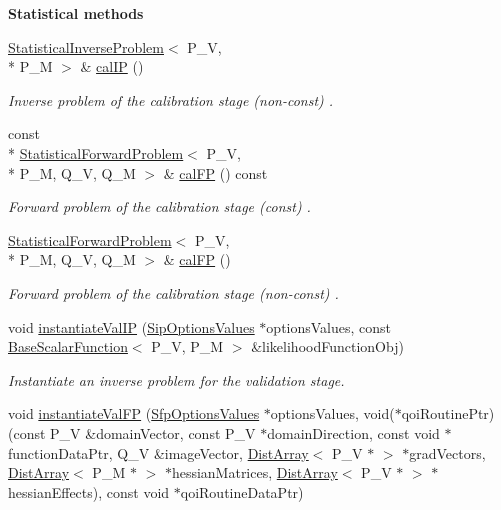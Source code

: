 \begin{Indent}{\bf Statistical methods}
\begin{DoxyCompactItemize}
\hyperlink{class_q_u_e_s_o_1_1_statistical_inverse_problem}{Statistical\-Inverse\-Problem}$<$ P\-\_\-\-V, \\*
P\-\_\-\-M $>$ \& \hyperlink{class_q_u_e_s_o_1_1_validation_cycle_a4ac209596278774d5f12e6d806a87d0a}{cal\-I\-P} ()
\begin{DoxyCompactList}\small\item\em Inverse problem of the calibration stage (non-\/const) . \end{DoxyCompactList}\item 
const \\*
\hyperlink{class_q_u_e_s_o_1_1_statistical_forward_problem}{Statistical\-Forward\-Problem}$<$ P\-\_\-\-V, \\*
P\-\_\-\-M, Q\-\_\-\-V, Q\-\_\-\-M $>$ \& \hyperlink{class_q_u_e_s_o_1_1_validation_cycle_ab3ee54cdc9d1d6f726414f4fd2142c56}{cal\-F\-P} () const 
\begin{DoxyCompactList}\small\item\em Forward problem of the calibration stage (const) . \end{DoxyCompactList}\item 
\hyperlink{class_q_u_e_s_o_1_1_statistical_forward_problem}{Statistical\-Forward\-Problem}$<$ P\-\_\-\-V, \\*
P\-\_\-\-M, Q\-\_\-\-V, Q\-\_\-\-M $>$ \& \hyperlink{class_q_u_e_s_o_1_1_validation_cycle_ad8214c581b3e0879cae7d0643af99f69}{cal\-F\-P} ()
\begin{DoxyCompactList}\small\item\em Forward problem of the calibration stage (non-\/const) . \end{DoxyCompactList}\item 
void \hyperlink{class_q_u_e_s_o_1_1_validation_cycle_ada0d69cdc89fe50d5b6cbefb37d3867b}{instantiate\-Val\-I\-P} (\hyperlink{class_q_u_e_s_o_1_1_sip_options_values}{Sip\-Options\-Values} $\ast$options\-Values, const \hyperlink{class_q_u_e_s_o_1_1_base_scalar_function}{Base\-Scalar\-Function}$<$ P\-\_\-\-V, P\-\_\-\-M $>$ \&likelihood\-Function\-Obj)
\begin{DoxyCompactList}\small\item\em Instantiate an inverse problem for the validation stage. \end{DoxyCompactList}\item 
void \hyperlink{class_q_u_e_s_o_1_1_validation_cycle_acd62b7e91aa2c0dffeb26a8e34fea5fb}{instantiate\-Val\-F\-P} (\hyperlink{class_q_u_e_s_o_1_1_sfp_options_values}{Sfp\-Options\-Values} $\ast$options\-Values, void($\ast$qoi\-Routine\-Ptr)(const P\-\_\-\-V \&domain\-Vector, const P\-\_\-\-V $\ast$domain\-Direction, const void $\ast$function\-Data\-Ptr, Q\-\_\-\-V \&image\-Vector, \hyperlink{class_q_u_e_s_o_1_1_dist_array}{Dist\-Array}$<$ P\-\_\-\-V $\ast$ $>$ $\ast$grad\-Vectors, \hyperlink{class_q_u_e_s_o_1_1_dist_array}{Dist\-Array}$<$ P\-\_\-\-M $\ast$ $>$ $\ast$hessian\-Matrices, \hyperlink{class_q_u_e_s_o_1_1_dist_array}{Dist\-Array}$<$ P\-\_\-\-V $\ast$ $>$ $\ast$hessian\-Effects), const void $\ast$qoi\-Routine\-Data\-Ptr)

\end{DoxyCompactItemize}
\end{Indent}
